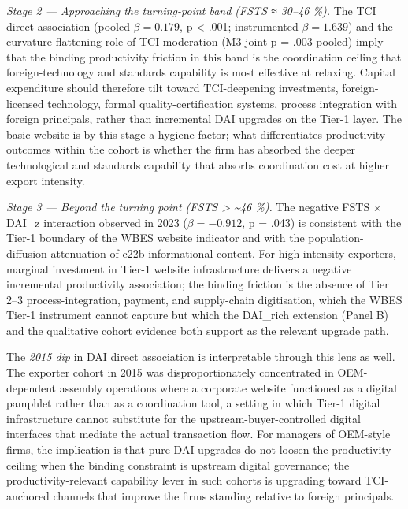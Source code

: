 \documentclass[12pt,a4paper]{article}
\begin{document}
\emph{Stage 2 --- Approaching the turning-point band (FSTS ≈ 30--46
\%).} The TCI direct association (pooled \(\beta = 0.179\), p
\textless{} .001; instrumented \(\beta = 1.639\)) and the
curvature-flattening role of TCI moderation (M3 joint p = .003 pooled)
imply that the binding productivity friction in this band is the
coordination ceiling that foreign-technology and standards capability is
most effective at relaxing. Capital expenditure should therefore tilt
toward TCI-deepening investments, foreign-licensed technology, formal
quality-certification systems, process integration with foreign
principals, rather than incremental DAI upgrades on the Tier-1 layer.
The basic website is by this stage a hygiene factor; what differentiates
productivity outcomes within the cohort is whether the firm has absorbed
the deeper technological and standards capability that absorbs
coordination cost at higher export intensity.

\emph{Stage 3 --- Beyond the turning point (FSTS \textgreater{}
\textasciitilde46 \%).} The negative FSTS × DAI\_z interaction observed
in 2023 (\(\beta = -0.912\), p = .043) is consistent with the Tier-1
boundary of the WBES website indicator and with the population-diffusion
attenuation of c22b informational content. For high-intensity exporters,
marginal investment in Tier-1 website infrastructure delivers a negative
incremental productivity association; the binding friction is the
absence of Tier 2--3 process-integration, payment, and supply-chain
digitisation, which the WBES Tier-1 instrument cannot capture but which
the DAI\_rich extension (Panel B) and the qualitative cohort evidence
both support as the relevant upgrade path.

The \emph{2015 dip} in DAI direct association is interpretable through
this lens as well. The exporter cohort in 2015 was disproportionately
concentrated in OEM-dependent assembly operations where a corporate
website functioned as a digital pamphlet rather than as a coordination
tool, a setting in which Tier-1 digital infrastructure cannot substitute
for the upstream-buyer-controlled digital interfaces that mediate the
actual transaction flow. For managers of OEM-style firms, the
implication is that pure DAI upgrades do not loosen the productivity
ceiling when the binding constraint is upstream digital governance; the
productivity-relevant capability lever in such cohorts is upgrading
toward TCI-anchored channels that improve the firm\textquotesingle s
standing relative to foreign principals.
\end{document}
